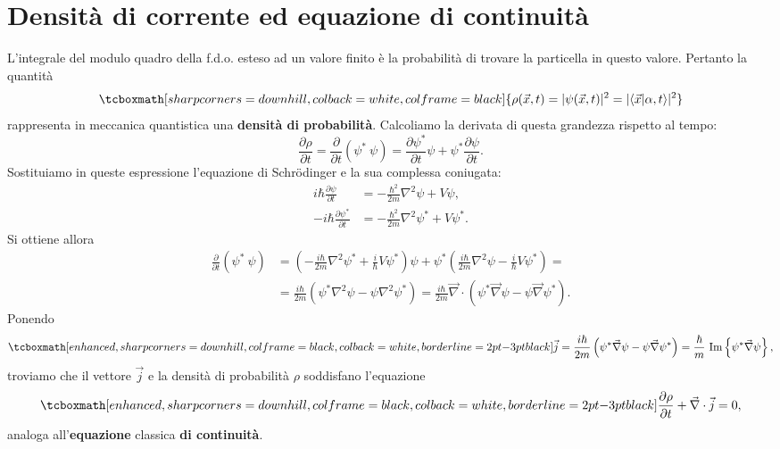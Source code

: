 \section[Densità di corrente ed equazione di continuità]{Densità di corrente ed equazione di continuità}
L'integrale del modulo quadro della f.d.o. esteso ad un valore finito è la probabilità di trovare la particella in questo valore. Pertanto la quantità
	\begin{equation}
		\tcboxmath[sharp corners=downhill, colback=white, colframe=black]{
			\rho (\vec{x}, t) = \vert \psi (\vec{x},t) \vert ^2 = \vert \langle \vec{x}\vert \alpha, t \rangle \vert ^2
				}
	\end{equation}
rappresenta in meccanica quantistica una \textbf{densità di probabilità}. Calcoliamo la derivata di questa grandezza rispetto al tempo:
	\begin{equation}
		\frac{\partial \rho}{\partial t} = \frac{\partial }{\partial t}\left( \psi^*\ \psi \right) = \frac{\partial \psi ^*}{\partial t}\psi + \psi^*\frac{\partial \psi}{\partial t}.
	\end{equation}
Sostituiamo in queste espressione l'equazione di Schr\"{o}dinger e la sua complessa coniugata:
	\begin{align}
	 	i\hbar \frac{\partial \psi}{\partial t} &= -\frac{\hbar ^2}{2m} \nabla ^ 2 \psi + V \psi ,\\[0.5cm]
		 -i\hbar \frac{\partial \psi ^*}{\partial t} &= -\frac{\hbar ^2}{2m} \nabla ^ 2 \psi ^* + V \psi ^* .
	\end{align}
Si ottiene allora
	\begin{align}
		\frac{\partial }{\partial t}\left(\psi^*\ \psi \right) & =  \left(-\frac{i\hbar}{2m}\nabla ^2 \psi ^* +\frac{i}{\hbar}V\psi ^*\right)\psi +  \psi ^* \left(\frac{i\hbar}{2m}\nabla ^2 \psi -\frac{i}{\hbar}V\psi ^*\right)= \nonumber\\[0.3cm]
		&=  \frac{i\hbar}{2m}\left(\psi ^* \nabla ^2 \psi - \psi \nabla ^2 \psi ^* \right) =  \frac{i\hbar}{2m} \vec{\nabla}\cdot \left(\psi ^* \vec{\nabla} \psi - \psi \vec{\nabla} \psi ^* \right). 
	\end{align}
Ponendo
	\begin{equation}
		\tcboxmath[enhanced, sharp corners=downhill, colframe=black, colback=white, borderline={2pt}{-3pt}{black}]{
			\vec{j}=\frac{i\hbar}{2m} \left(\psi ^* \vec{\nabla} \psi - \psi \vec{\nabla} \psi ^* \right)= \frac{\hbar}{m}\ \textrm{Im}\left\{\psi ^* \vec{\nabla}\psi \right\},
			}
	\end{equation}
troviamo che il vettore $\vec{j}$ e la densità di probabilità $\rho$ soddisfano l'equazione
	\begin{equation}
		\tcboxmath[enhanced, sharp corners=downhill, colframe=black, colback=white, borderline={2pt}{-3pt}{black}]{
			\frac{\partial \rho}{\partial t}+ \vec{\nabla}\cdot\vec{j}=0,
				}
	\end{equation}
analoga all'\textbf{equazione} classica \textbf{di continuità}.\\

